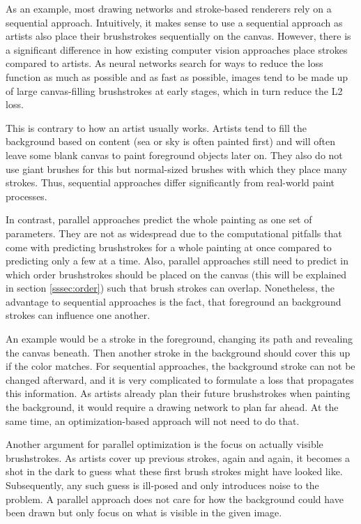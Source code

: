 As an example, most drawing networks and stroke-based renderers rely on a sequential approach.
Intuitively, it makes sense to use a sequential approach as artists also place their brushstrokes sequentially on the canvas.
However, there is a significant difference in how existing computer vision approaches place strokes compared to artists.
As neural networks search for ways to reduce the loss function as much as possible and as fast as possible, images tend to be made up of large canvas-filling brushstrokes at early stages, which in turn reduce the L2 loss.

This is contrary to how an artist usually works.
Artists tend to fill the background based on content (\eg sea or sky is often painted first) and will often leave some blank canvas to paint foreground objects later on.
They also do not use giant brushes for this but normal-sized brushes with which they place many strokes.
Thus, sequential approaches differ significantly from real-world paint processes.

In contrast, parallel approaches predict the whole painting as one set of parameters.
They are not as widespread due to the computational pitfalls that come with predicting brushstrokes for a whole painting at once compared to predicting only a few at a time.
Also, parallel approaches still need to predict in which order brushstrokes should be placed on the canvas (this will be explained in section \ref{sssec:order}) such that brush strokes can overlap.
Nonetheless, the advantage to sequential approaches is the fact, that foreground an background strokes can influence one another.

An example would be a stroke in the foreground, changing its path and revealing the canvas beneath.
Then another stroke in the background should cover this up if the color matches.
For sequential approaches, the background stroke can not be changed afterward, and it is very complicated to formulate a loss that propagates this information.
As artists already plan their future brushstrokes when painting the background, it would require a drawing network to plan far ahead.
At the same time, an optimization-based approach will not need to do that.

Another argument for parallel optimization is the focus on actually visible brushstrokes.
As artists cover up previous strokes, again and again, it becomes a shot in the dark to guess what these first brush strokes might have looked like.
Subsequently, any such guess is ill-posed and only introduces noise to the problem.
A parallel approach does not care for how the background could have been drawn but only focus on what is visible in the given image.

